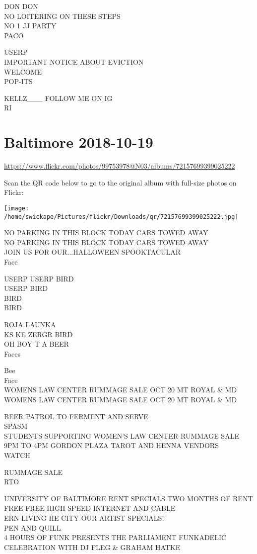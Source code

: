 \documentclass[10pt,letterpaper]{article}
\begin{document}
DON DON\\
NO LOITERING ON THESE STEPS\\
NO 1 JJ PARTY\\
PACO

USERP\\
IMPORTANT NOTICE ABOUT EVICTION\\
WELCOME\\
POP{-}ITS

KELLZ\_\_\_ FOLLOW ME ON IG\\
RI


\section*{Baltimore 2018-10-19}

\url{https://www.flickr.com/photos/99753978@N03/albums/72157699399025222}

Scan the QR code below to go to the original album with full-size photos on Flickr:

\texttt{[image: /home/swickape/Pictures/flickr/Downloads/qr/72157699399025222.jpg]}


NO PARKING IN THIS BLOCK TODAY CARS TOWED AWAY\\
NO PARKING IN THIS BLOCK TODAY CARS TOWED AWAY\\
JOIN US FOR OUR...HALLOWEEN SPOOKTACULAR\\
Face

USERP USERP BIRD\\
USERP BIRD\\
BIRD\\
BIRD

ROJA LAUNKA\\
KS KE ZERGR BIRD\\
OH BOY T A BEER\\
Faces

Bee\\
Face\\
WOMENS LAW CENTER RUMMAGE SALE OCT 20 MT ROYAL \& MD\\
WOMENS LAW CENTER RUMMAGE SALE OCT 20 MT ROYAL \& MD

BEER PATROL TO FERMENT AND SERVE\\
SPASM\\
STUDENTS SUPPORTING WOMEN'S LAW CENTER RUMMAGE SALE 9PM TO 4PM GORDON PLAZA TAROT AND HENNA VENDORS\\
WATCH

RUMMAGE SALE\\
RTO

UNIVERSITY OF BALTIMORE RENT SPECIALS TWO MONTHS OF RENT FREE FREE HIGH SPEED INTERNET AND CABLE\\
ERN LIVING HE CITY OUR ARTIST SPECIALS!\\
PEN AND QUILL\\
4 HOURS OF FUNK PRESENTS THE PARLIAMENT FUNKADELIC CELEBRATION WITH DJ FLEG \& GRAHAM HATKE
\end{document}
